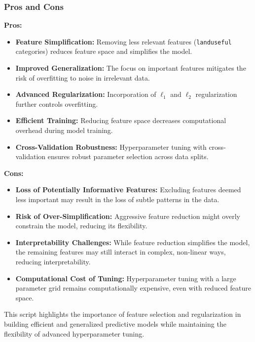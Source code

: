 \subsubsection*{Pros and Cons}

\textbf{Pros:}
\begin{itemize}
    \item \textbf{Feature Simplification:} Removing less relevant features (\texttt{landuseful} categories) reduces feature space and simplifies the model.
    \item \textbf{Improved Generalization:} The focus on important features mitigates the risk of overfitting to noise in irrelevant data.
    \item \textbf{Advanced Regularization:} Incorporation of \(\ell_1\) and \(\ell_2\) regularization further controls overfitting.
    \item \textbf{Efficient Training:} Reducing feature space decreases computational overhead during model training.
    \item \textbf{Cross-Validation Robustness:} Hyperparameter tuning with cross-validation ensures robust parameter selection across data splits.
\end{itemize}

\textbf{Cons:}
\begin{itemize}
    \item \textbf{Loss of Potentially Informative Features:} Excluding features deemed less important may result in the loss of subtle patterns in the data.
    \item \textbf{Risk of Over-Simplification:} Aggressive feature reduction might overly constrain the model, reducing its flexibility.
    \item \textbf{Interpretability Challenges:} While feature reduction simplifies the model, the remaining features may still interact in complex, non-linear ways, reducing interpretability.
    \item \textbf{Computational Cost of Tuning:} Hyperparameter tuning with a large parameter grid remains computationally expensive, even with reduced feature space.
\end{itemize}

This script highlights the importance of feature selection and regularization in building efficient and generalized predictive models while maintaining the flexibility of advanced hyperparameter tuning.\\

\hrulefill


